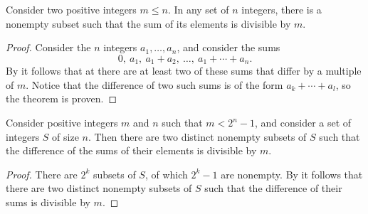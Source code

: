\begin{theorem}
  Consider two positive integers $m\leq n$. In any set of $n$ integers, there is a nonempty subset such that the sum of its elements is divisible by $m$.
\end{theorem}

\begin{proof}
  Consider the $n$ integers $a_1,\ldots,a_n$, and consider the sums
  \begin{equation*}
    0,~a_1,~a_1+a_2,~\ldots,~a_1+\cdots+a_n.
  \end{equation*}
  By  it follows that at there are at least two of these sums that differ by a multiple of $m$. Notice that the difference of two such sums is of the form $a_k+\cdots+a_l$, so the theorem is proven.
\end{proof}

\begin{theorem}
  Consider positive integers $m$ and $n$ such that $m<2^n-1$, and consider a set of integers $S$ of size $n$. Then there are two distinct nonempty subsets of $S$ such that the difference of the sums of their elements is divisible by $m$.
\end{theorem}

\begin{proof}
  There are $2^k$ subsets of $S$, of which $2^k-1$ are nonempty. By  it follows that there are two distinct nonempty subsets of $S$ such that the difference of their sums is divisible by $m$.
\end{proof}

\exercises


